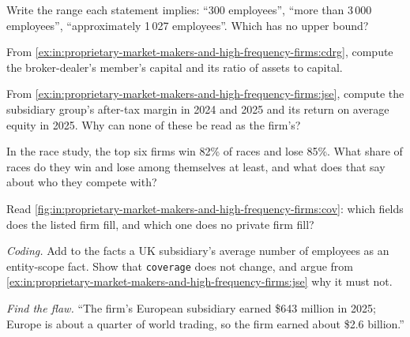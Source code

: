 \begin{exercise}[$\star$]\label{exo:in:proprietary-market-makers-and-high-frequency-firms:2}
Write the range each statement implies: ``300 employees'', ``more than 3\,000 employees'', ``approximately 1\,027
employees''. Which has no upper bound?
\end{exercise}

\begin{exercise}[$\star$]\label{exo:in:proprietary-market-makers-and-high-frequency-firms:3}
From \cref{ex:in:proprietary-market-makers-and-high-frequency-firms:cdrg}, compute the broker-dealer's member's capital
and its ratio of assets to capital.
\end{exercise}

\begin{exercise}[$\star\star$]\label{exo:in:proprietary-market-makers-and-high-frequency-firms:4}
From \cref{ex:in:proprietary-market-makers-and-high-frequency-firms:jse}, compute the subsidiary group's after-tax
margin in 2024 and 2025 and its return on average equity in 2025. Why can none of these be read as the firm's?
\end{exercise}

\begin{exercise}[$\star\star$]\label{exo:in:proprietary-market-makers-and-high-frequency-firms:5}
In the race study, the top six firms win 82\% of races and lose 85\%. What share of races do they win and lose among
themselves at least, and what does that say about who they compete with?
\end{exercise}

\begin{exercise}[$\star\star$]\label{exo:in:proprietary-market-makers-and-high-frequency-firms:6}
Read \cref{fig:in:proprietary-market-makers-and-high-frequency-firms:cov}: which fields does the listed firm fill, and
which one does no private firm fill?
\end{exercise}

\begin{exercise}[$\star\star\star$]\label{exo:in:proprietary-market-makers-and-high-frequency-firms:7}
\emph{Coding.} Add to the facts a UK subsidiary's average number of employees as an entity-scope fact. Show that
\texttt{coverage} does not change, and argue from \cref{ex:in:proprietary-market-makers-and-high-frequency-firms:jse} why
it must not.
\end{exercise}

\begin{exercise}[$\star\star\star$]\label{exo:in:proprietary-market-makers-and-high-frequency-firms:8}
\emph{Find the flaw.} ``The firm's European subsidiary earned \$643 million in 2025; Europe is about a quarter of world
trading, so the firm earned about \$2.6 billion.''
\end{exercise}

